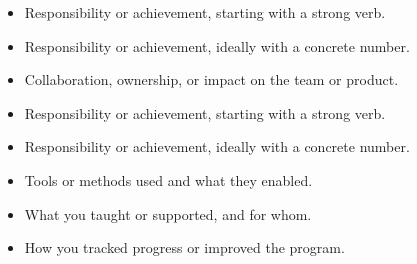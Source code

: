 
\begin{itemize}
  \item Responsibility or achievement, starting with a strong verb.
  \item Responsibility or achievement, ideally with a concrete number.
  \item Collaboration, ownership, or impact on the team or product.
\end{itemize}

\begin{itemize}
  \item Responsibility or achievement, starting with a strong verb.
  \item Responsibility or achievement, ideally with a concrete number.
  \item Tools or methods used and what they enabled.
\end{itemize}

\begin{itemize}
  \item What you taught or supported, and for whom.
  \item How you tracked progress or improved the program.
\end{itemize}
